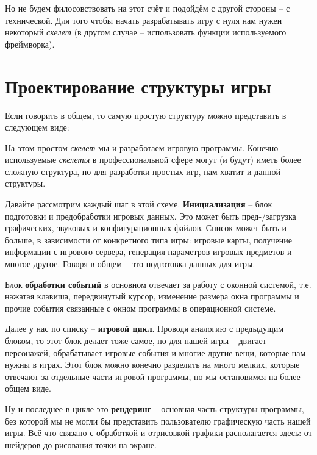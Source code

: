 Но не будем филосовствовать на этот счёт и подойдём с другой стороны -- с технической. Для того чтобы начать
разрабатывать игру с нуля нам нужен некоторый \emph{скелет} (в другом случае -- использовать функции используемого фреймворка).

\section{Проектирование структуры игры}

Если говорить в общем, то самую простую структуру можно представить в следующем виде:

\begin{figure}
    \label{img:skeleton}
\end{figure}

На этом простом \emph{скелет} мы и разработаем игровую программы. Конечно используемые \emph{скелеты} в 
профессиональной сфере могут (и будут) иметь более сложную структура, но для разработки простых игр, нам 
хватит и данной структуры.

Давайте рассмотрим каждый шаг в этой схеме. \textbf{Инициализация} -- блок подготовки и предобработки игровых
данных. Это может быть пред-/загрузка графических, звуковых и конфигурационных файлов. Список может быть 
и больше, в зависимости от конкретного типа игры: игровые карты, получение информации с игрового сервера, 
генерация параметров игровых предметов и многое другое. Говоря в общем -- это подготовка данных для игры.

Блок \textbf{обработки событий} в основном отвечает за работу с оконной системой, т.е. нажатая клавиша, 
передвинутый курсор, изменение размера окна программы и прочие события связанные с окном программы в 
операционной системе. 

Далее у нас по списку -- \textbf{игровой цикл}. Проводя аналогию с предыдущим блоком, то этот блок делает 
тоже самое, но для нашей игры -- двигает персонажей, обрабатывает игровые события и многие другие вещи, 
которые нам нужны в играх. Этот блок можно конечно разделить на много мелких, которые отвечают за 
отдельные части игровой программы, но мы остановимся на более общем виде. 

Ну и последнее в цикле это \textbf{рендеринг} -- основная часть структуры программы, без которой мы не могли 
бы представить пользователю графическую часть нашей игры. Всё что связано с обработкой и отрисовкой графики 
располагается здесь: от шейдеров до рисования точки на экране.

